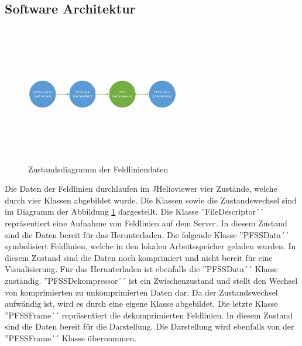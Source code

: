 \subsection{Software Architektur}
\begin{figure}[!htbp]
	\center
	\includegraphics[width=0.6\textwidth,height=6cm,keepaspectratio]{./pictures/implementation/dataflow.png}
	\caption{Zustandsdiagramm der Feldliniendaten}
	\label{implementation:architektur:datenfluss}
\end{figure}
Die Daten der Feldlinien durchlaufen im JHelioviewer vier Zustände, welche durch vier Klassen abgebildet wurde. Die Klassen sowie die Zustandswechsel sind im Diagramm der Abbildung \ref{implementation:architektur:datenfluss} dargestellt. Die Klasse ''FileDescriptor´´ repräsentiert eine Aufnahme von Feldlinien auf dem Server. In diesem Zustand sind die Daten bereit für das Herunterladen. Die folgende Klasse ''PFSSData´´ symbolisiert Feldlinien, welche in den lokalen Arbeitsspeicher geladen wurden. In diesem Zustand sind die Daten noch komprimiert und nicht bereit für eine Visualisierung. Für das Herunterladen ist ebenfalls die ''PFSSData´´ Klasse zuständig. ''PFSSDekompressor´´ ist ein Zwischenzustand und stellt den Wechsel von komprimierten zu unkomprimierten Daten dar. Da der Zustandswechsel aufwändig ist, wird es durch eine eigene Klasse abgebildet. Die letzte Klasse ''PFSSFrame´´ repräsentiert die dekomprimierten Feldlinien. In diesem Zustand sind die Daten bereit für die Darstellung. Die Darstellung wird ebenfalls von der ''PFSSFrame´´ Klasse übernommen.

